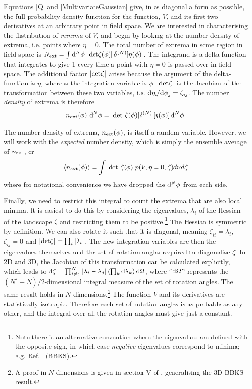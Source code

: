 \documentclass[12pt]{article}
\begin{document}
Equations \eqref{Q} and \eqref{MultivariateGaussian} give, in as diagonal a form as possible, the full probability density function for the function, $V$, and its first two derivatives at an arbitrary point in field space. We are interested in characterising the distribution of \emph{minima} of $V$, and begin by looking at the number density of extrema, i.e. points where $\eta=0$. The total number of extrema in some region in field space is $N_{\rm ext} = \int {\rm d}^N\phi \, \left| {\rm det}\zeta(\phi)\right|\delta^{(N)}[\eta(\phi)]$. The integrand is a delta-function that integrates to give 1 every time a point with $\eta=0$ is passed over in field space. The additional factor $\left| {\rm det \zeta} \right|$ arises because the argument of the delta-function is $\eta$, whereas the integration variable is $\phi$. $|{\rm det}\zeta|$ is the Jacobian of the transformation between these two variables, i.e. ${\rm d}\eta_i/{\rm d}\phi_j = \zeta_{ij}$. The number \emph{density} of extrema is therefore
%
\begin{equation}
n_{\rm ext}(\phi) \,\,{\rm d}^N \phi= |{\rm det}\,\, \zeta(\phi)| \delta^{(N)}\left[ \eta(\phi)\right] {\rm d}^N \phi.
\end{equation}

%
The number density of extrema, $n_{\rm ext}(\phi)$, is itself a random variable. However, we will work with the \emph{expected} number density, which is simply the ensemble average of $n_{\rm ext}$, or
% 
\begin{equation} \label{NumberDensity}
\langle n_{\rm ext}(\phi)  \rangle= \int |{\rm det}\,\, \zeta(\phi)| p(V,\eta=0,\zeta)d\nu d\zeta
\end{equation}
where for notational convenience we have dropped the ${\rm d}^N \phi$ from each side.

Finally, we need to restrict this integral to count the extrema that are also local minima. It is easiest to do this by considering the eigenvalues, $\lambda_i$ of the Hessian of the landscape $\zeta$ and restricting them to be positive.\footnote{Note there is an alternative convention where the eigenvalues are defined with the opposite sign, in which case \emph{negative} eigenvalues correspond to minima; e.g. Ref.~\cite{BBKS} (BBKS).}  The Hessian is symmetric by definition. We can also rotate it such that it is diagonal, meaning  $\zeta_{ii}=\lambda_i$, $\zeta_{ij}=0$ and $|{\rm det} \zeta| = \prod_i |\lambda_i|$. The new integration variables are then the eigenvalues themselves and the set of rotation angles required to diagonalise $\zeta$.  In 2D and 3D, the Jacobian of this transformation can be calculated explicitly, which leads to  ${\rm d} \zeta = \prod_{i \neq j}^N |\lambda_i - \lambda_j|\left(\prod_k {\rm d}\lambda_k\right) {\rm d} \Omega$, where ``${\rm d}\Omega$'' represents the $(N^2-N)/2$-dimensional integral measure of the set of rotation angles. The same result holds in $N$ dimensions.\footnote{A proof in $N$ dimensions is given in section V of \cite{Easther2016}, generalising the 3D  BBKS result.} The function $V$ and its derivatives are statistically isotropic. Therefore each set of rotation angles is as probable as any other, and the integral over all the rotation angles must give just a constant.
\end{document}
